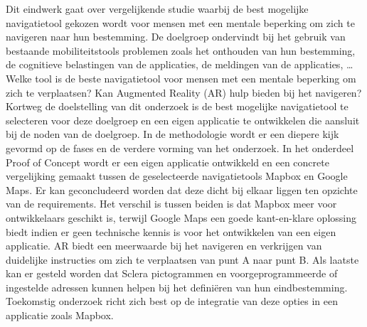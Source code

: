Dit eindwerk gaat over vergelijkende studie waarbij de best mogelijke navigatietool gekozen wordt voor mensen met een mentale beperking om zich te navigeren naar hun bestemming. De doelgroep ondervindt bij het gebruik van bestaande mobiliteitstools problemen zoals het onthouden van hun bestemming, de cognitieve belastingen van de applicaties, de meldingen van de applicaties, \ldots Welke tool is de beste navigatietool voor mensen met een mentale beperking om zich te verplaatsen? Kan Augmented Reality (AR) hulp bieden bij het navigeren? Kortweg de doelstelling van dit onderzoek is de best mogelijke navigatietool te selecteren voor deze doelgroep en een eigen applicatie te ontwikkelen die aansluit bij de noden van de doelgroep. In de methodologie wordt er een diepere kijk gevormd op de fases en de verdere vorming van het onderzoek. In het onderdeel Proof of Concept wordt er een eigen applicatie ontwikkeld en een concrete vergelijking gemaakt tussen de geselecteerde navigatietools Mapbox en Google Maps. Er kan geconcludeerd worden dat deze dicht bij elkaar liggen ten opzichte van de requirements. Het verschil is tussen beiden is dat Mapbox meer voor ontwikkelaars geschikt is, terwijl Google Maps een goede kant-en-klare oplossing biedt indien er geen technische kennis is voor het ontwikkelen van een eigen applicatie. AR biedt een meerwaarde bij het navigeren en verkrijgen van duidelijke instructies om zich te verplaatsen van punt A naar punt B. Als laatste kan er gesteld worden dat Sclera pictogrammen en voorgeprogrammeerde of ingestelde adressen kunnen helpen bij het definiëren van hun eindbestemming. Toekomstig onderzoek richt zich best op de integratie van deze opties in een applicatie zoals Mapbox.
